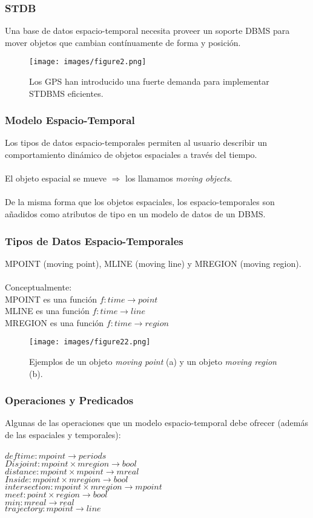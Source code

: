 \documentclass[12pt]{beamer}
\begin{document}
\begin{frame}
\frametitle{STDB}
Una base de datos espacio-temporal necesita proveer un soporte DBMS para mover objetos que cambian cont\'inuamente de forma y posici\'on.
\begin{figure}
\centering
\texttt{[image: images/figure2.png]}
\caption{Los GPS han introducido una fuerte demanda para implementar STDBMS eficientes.}
\end{figure}
\end{frame}

\begin{frame}
\frametitle{Modelo Espacio-Temporal}
Los tipos de datos espacio-temporales permiten al usuario describir un comportamiento din\'amico de objetos espaciales a trav\'es del tiempo.\\
\ \\
El objeto espacial se mueve $\Rightarrow$ los llamamos \textit{moving objects}.\\
\ \\
De la misma forma que los objetos espaciales, los espacio-temporales son a\~nadidos como atributos de tipo en un modelo de datos de un DBMS.

\end{frame}

\begin{frame}
\frametitle{Tipos de Datos Espacio-Temporales}
MPOINT (moving point), MLINE (moving line) y MREGION (moving region).\\
\ \\
Conceptualmente:\\
MPOINT es una funci\'on $f : time \rightarrow point$\\
MLINE es una funci\'on $f : time \rightarrow line$\\
MREGION es una funci\'on $f : time \rightarrow region$\\
\begin{figure}
\centering
\texttt{[image: images/figure22.png]}
\caption{Ejemplos de un objeto \textit{moving point} (a) y un objeto \textit{moving region} (b).}
\end{figure}
\end{frame}

\begin{frame}
\frametitle{Operaciones y Predicados}
Algunas de las operaciones que un modelo espacio-temporal debe ofrecer (adem\'as de las espaciales y temporales):\\
\ \\
$deftime: mpoint \rightarrow periods$\\
$Disjoint: mpoint \times mregion \rightarrow bool$\\
$distance: mpoint \times mpoint \rightarrow mreal$\\
$Inside: mpoint \times mregion \rightarrow bool$\\
$intersection: mpoint \times mregion \rightarrow mpoint$\\
$meet: point \times region \rightarrow bool$\\
$min: mreal \rightarrow real$\\
$trajectory: mpoint \rightarrow line$\\
\end{frame}
\end{document}

